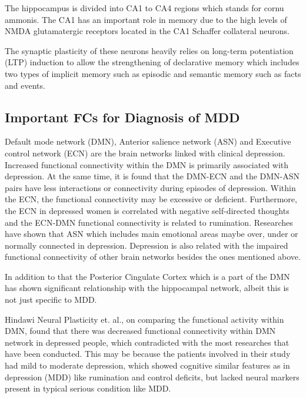\documentclass{article}
\begin{document}
The hippocampus is divided into CA1 to CA4 regions which stands for
cornu ammonis. The CA1 has an important role in memory due to the high
levels of NMDA glutamatergic receptors located in the CA1 Schaffer
collateral neurons.

The synaptic plasticity of these neurons heavily relies on long-term
potentiation (LTP) induction to allow the strengthening of declarative
memory which includes two types of implicit memory such as episodic
and semantic memory such as facts and events.

\newpage

\subsection{Important FCs for Diagnosis of MDD}

Default mode network (DMN), Anterior salience network (ASN) and
Executive control network (ECN) are the brain networks linked with
clinical depression. Increased functional connectivity within the DMN
is primarily associated with depression. At the same time, it is found
that the DMN-ECN and the DMN-ASN pairs have less interactions or
connectivity during episodes of depression. Within the ECN, the
functional connectivity may be excessive or deficient. Furthermore,
the ECN in depressed women is correlated with negative self-directed
thoughts and the ECN-DMN functional connectivity is related to
rumination.  Researches have shown that ASN which includes main
emotional areas maybe over, under or normally connected in depression.
Depression is also related with the impaired functional connectivity
of other brain networks besides the ones mentioned above.

In addition to that the Posterior Cingulate Cortex which is a part of
the DMN has shown significant relationship with the hippocampal
network, albeit this is not just specific to MDD.


Hindawi Neural Plasticity et. al., on comparing the functional
activity within DMN, found that there was decreased functional
connectivity within DMN network in depressed people, which
contradicted with the most researches that have been conducted. This
may be because the patients involved in their study had mild to
moderate depression, which showed cognitive similar features as in
depression (MDD) like rumination and control deficits, but lacked
neural markers present in typical serious condition like MDD.
\end{document}
